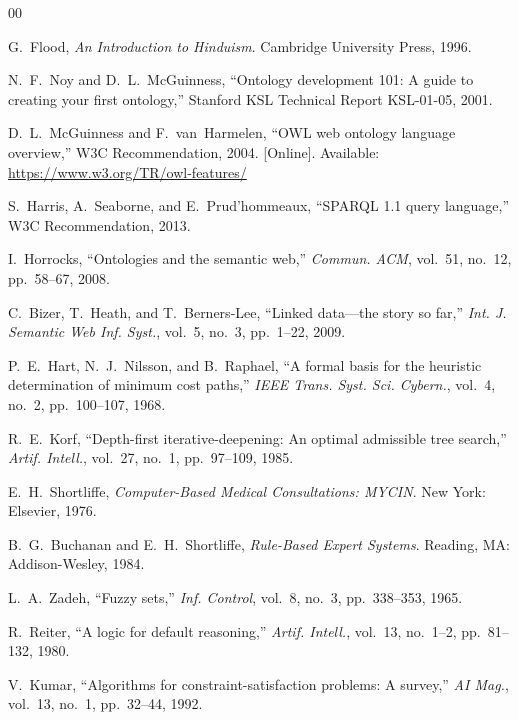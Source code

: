 \documentclass[conference]{IEEEtran}
\begin{document}
\begin{thebibliography}{00}

G.~Flood, \textit{An Introduction to Hinduism}.
Cambridge University Press, 1996.

N.~F.~Noy and D.~L.~McGuinness,
``Ontology development 101: A guide to creating your first ontology,''
Stanford KSL Technical Report KSL-01-05, 2001.

D.~L.~McGuinness and F.~van~Harmelen,
``OWL web ontology language overview,''
W3C Recommendation, 2004.
[Online]. Available: \url{https://www.w3.org/TR/owl-features/}

S.~Harris, A.~Seaborne, and E.~Prud'hommeaux,
``SPARQL 1.1 query language,'' W3C Recommendation, 2013.

I.~Horrocks,
``Ontologies and the semantic web,''
\textit{Commun. ACM}, vol.~51, no.~12, pp.~58--67, 2008.

C.~Bizer, T.~Heath, and T.~Berners-Lee,
``Linked data—the story so far,''
\textit{Int. J. Semantic Web Inf. Syst.}, vol.~5, no.~3, pp.~1--22, 2009.

P.~E.~Hart, N.~J.~Nilsson, and B.~Raphael,
``A formal basis for the heuristic determination of minimum cost paths,''
\textit{IEEE Trans. Syst. Sci. Cybern.}, vol.~4, no.~2, pp.~100--107, 1968.

R.~E.~Korf,
``Depth-first iterative-deepening: An optimal admissible tree search,''
\textit{Artif. Intell.}, vol.~27, no.~1, pp.~97--109, 1985.

E.~H.~Shortliffe,
\textit{Computer-Based Medical Consultations: MYCIN}.
New York: Elsevier, 1976.

B.~G.~Buchanan and E.~H.~Shortliffe,
\textit{Rule-Based Expert Systems}.
Reading, MA: Addison-Wesley, 1984.

L.~A.~Zadeh, ``Fuzzy sets,''
\textit{Inf. Control}, vol.~8, no.~3, pp.~338--353, 1965.

R.~Reiter, ``A logic for default reasoning,''
\textit{Artif. Intell.}, vol.~13, no.~1--2, pp.~81--132, 1980.

V.~Kumar,
``Algorithms for constraint-satisfaction problems: A survey,''
\textit{AI Mag.}, vol.~13, no.~1, pp.~32--44, 1992.


\end{thebibliography}
\end{document}
